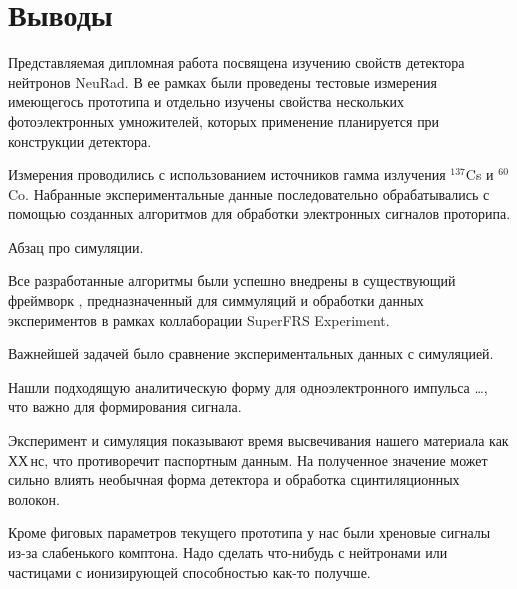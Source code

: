 \section{Выводы}

Представляемая дипломная работа посвящена изучению свойств детектора нейтронов NeuRad. В ее рамках были проведены тестовые измерения имеющегось прототипа и отдельно изучены свойства нескольких фотоэлектронных умножителей, которых применение планируется при конструкции детектора.

Измерения проводились с использованием источников гамма излучения $^{137}$Cs и $^{60}$Co. Набранные экспериментальные данные последовательно обрабатывались с помощью созданных алгоритмов для обработки электронных сигналов проторипа. 

Абзац про симуляции.


Все разработанные алгоритмы были успешно внедрены в существующий фреймворк \er, предназначенный для симмуляций и обработки данных экспериментов в рамках коллаборации SuperFRS Experiment.

Важнейшей задачей было сравнение экспериментальных данных с симуляцией.

Нашли подходящую аналитическую форму для одноэлектронного импульса \ldots, что важно для формирования сигнала.

Эксперимент и симуляция показывают время высвечивания нашего материала как ХХ\,нс, что противоречит паспортным данным. На полученное значение может сильно влиять необычная форма детектора и обработка сцинтиляционных волокон.

Кроме фиговых параметров текущего прототипа у нас были хреновые сигналы из-за слабенького комптона. Надо сделать что-нибудь с нейтронами или частицами с ионизирующей способностью как-то получше.




